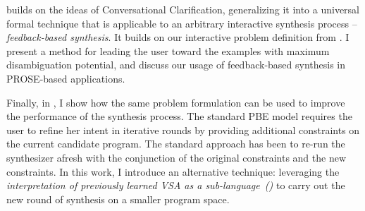  builds on the ideas of Conversational Clarification, generalizing it into a universal
formal technique that is applicable to an arbitrary interactive synthesis process -- \emph{feedback-based synthesis}.
It builds on our interactive problem definition from .
I present a method for leading the user toward the examples with maximum disambiguation potential, and discuss our
usage of feedback-based synthesis in PROSE-based applications.

Finally, in , I show how the same problem formulation can be used to improve the
performance of the synthesis process.
The standard PBE model requires the user to refine her intent in iterative rounds by providing additional constraints on
the current candidate program.
The standard approach has been to re-run the synthesizer afresh with the conjunction of the original constraints and the
new constraints.
In this work, I introduce an alternative technique: leveraging the \emph{interpretation of previously learned VSA as a
sub-language~()} to carry out the new round of synthesis on a smaller program space.





